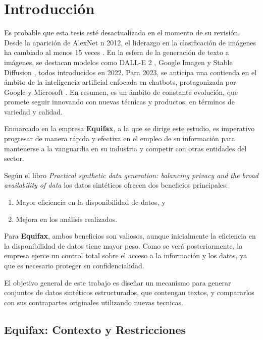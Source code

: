 \chapter{Introducción}

Es probable que esta tesis esté desactualizada en el momento de su revisión. Desde la aparición de AlexNet \cite{krizhevsky_imagenet_2012} n 2012, el liderazgo en la clasificación de imágenes ha cambiado al menos 15 veces \cite{noauthor_papers_nodate}. En la esfera de la generación de texto a imágenes, se destacan modelos como DALL-E 2 \cite{noauthor_dalle_nodate}, Google Imagen \cite{noauthor_imagen_nodate} y Stable Diffusion \cite{noauthor_stable_nodate}, todos introducidos en 2022. Para 2023, se anticipa una contienda en el ámbito de la inteligencia artificial enfocada en chatbots, protagonizada por Google y Microsoft \cite{milmo_google_2023, noauthor_microsoft_2023}. En resumen, es un ámbito de constante evolución, que promete seguir innovando con nuevas técnicas y productos, en términos de variedad y calidad.

Enmarcado en la empresa \textbf{Equifax}, a la que se dirige este estudio, es imperativo progresar de manera rápida y efectiva en el empleo de su información para mantenerse a la vanguardia en su industria y competir con otras entidades del sector.


Según el libro \emph{Practical synthetic data generation: balancing privacy and the broad availability of data} \cite{el_emam_practical_2020} los datos sintéticos ofrecen dos beneficios principales:
\begin{enumerate}
    \item Mayor eficiencia en la disponibilidad de datos, y
    \item Mejora en los análisis realizados.
\end{enumerate}

Para \textbf{Equifax}, ambos beneficios son valiosos, aunque inicialmente la eficiencia en la disponibilidad de datos tiene mayor peso. Como se verá posteriormente, la empresa ejerce un control total sobre el acceso a la información y los datos, ya que es necesario proteger su confidencialidad.

El objetivo general de este trabajo es diseñar un mecanismo para generar conjuntos de datos sintéticos estructurados, que contengan textos, y compararlos con sus contrapartes originales utilizando nuevas tecnicas.

\section{Equifax: Contexto y Restricciones}

